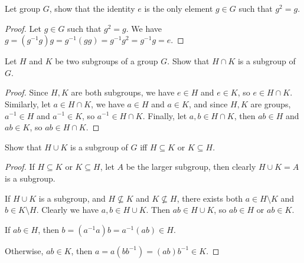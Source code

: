 \documentclass[12pt]{article}
\begin{document}
\begin{question}
    Let group $G$, show that the identity $e$ is the only element $g \in G$
    such that $g^{2} = g$.
\end{question}
\begin{proof}
    Let $g \in G$ such that $g^{2} = g$. We have
    $g = (g^{-1}g)g = g^{-1}(gg) = g^{-1}g^{2} = g^{-1}g = e$.
\end{proof}

\begin{question}
    Let $H$ and $K$ be two subgroups of a group $G$.
    Show that $H \cap K$ is a subgroup of $G$.
\end{question}
\begin{proof} 
    Since $H,K$ are both subgroups, we have $e \in H$ and $e \in K$,
    so $e \in H \cap K$.
    Similarly, let $a \in H \cap K$, we have $a \in H$ and $a \in K$,
    and since $H,K$ are groups, $a^{-1} \in H$ and $a^{-1} \in K$,
    so $a^{-1} \in H \cap K$.
    Finally, let $a,b \in H \cap K$, then
    $ab \in H$ and $ab \in K$, so $ab \in H \cap K$.
\end{proof}

\begin{subquestion}
    Show that $H \cup K$ is a subgroup of $G$
    iff $H \subseteq K$ or $K \subseteq H$.
\end{subquestion}
\begin{proof}
    If $H \subseteq K$ or $K \subseteq H$,
    let $A$ be the larger subgroup, then clearly $H \cup K = A$ is a subgroup.

    If $H \cup K$ is a subgroup, 
    and $H \nsubseteq K$ and $K \nsubseteq H$,
    there exists both $a \in H \setminus K$ and $b \in K \setminus H$.
    Clearly we have $a,b \in H \cup K$.
    Then $ab \in H \cup K$, so $ab \in H$ or $ab \in K$.
    \item If $ab \in H$, then $b = (a^{-1}a)b = a^{-1}(ab) \in H$.
    \item Otherwise, $ab \in K$, then $a = a(bb^{-1}) = (ab)b^{-1} \in K$.
\end{proof}
\end{document}

